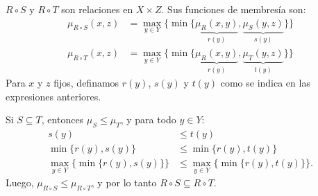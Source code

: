 
\(R\circ S\) y \(R\circ T\) son relaciones en \(X × Z\).
Sus funciones de membresía son:
\begin{align*}
  μ_{R\circ S}(x, z) &= \max_{y ∈ Y}\bigl\{
    \min\{
      \underbrace{μ_R(x, y)}_{r(y)},
      \underbrace{μ_S(y, z)}_{s(y)}
    \}
  \bigr\}
  \\
  μ_{R\circ T}(x, z) &= \max_{y ∈ Y}\bigl\{
    \min\{
      \underbrace{μ_R(x, y)}_{r(y)},
      \underbrace{μ_T(y, z)}_{t(y)}
    \}
  \bigr\}
\end{align*}
Para \(x\) y \(z\) fijos,
definamos \(r(y)\), \(s(y)\) y \(t(y)\)
como se indica en las expresiones anteriores.

Si \(S ⊆ T\), entonces \(μ_S ≤ μ_T\), y para todo \(y ∈ Y\):
\begin{align*}
     s(y)
  &≤ t(y) \\
     \min\{r(y), s(y)\}
  &≤ \min\{r(y), t(y)\} \\
     \max_{y ∈ Y}\bigl\{\min\{r(y), s(y)\}\bigr\}
  &≤ \max_{y ∈ Y}\bigl\{\min\{r(y), t(y)\}\bigr\}.
\end{align*}
Luego, \(μ_{R\circ S} ≤ μ_{R\circ T}\),
y por lo tanto \(R\circ S ⊆ R\circ T\).

